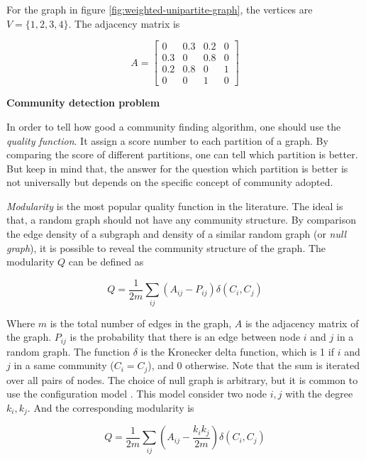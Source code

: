 For the graph in figure \ref{fig:weighted-unipartite-graph},
the vertices are $V = \{1, 2, 3, 4\}$.
The adjacency matrix is

\begin{equation*}
	A =
	\begin{bmatrix}
		0   & 0.3 & 0.2 & 0 \\
		0.3 & 0   & 0.8 & 0 \\
		0.2 & 0.8 & 0   & 1 \\
		0   & 0   & 1   & 0
	\end{bmatrix}
\end{equation*}

\textbf{Community detection problem}

In order to tell how good a community finding algorithm, one should use the \textit{quality function}.
It assign a score number to each partition of a graph.
By comparing the score of different partitions, one can tell which partition is better.
But keep in mind that, the answer for the question which partition is better is not universally
but depends on the specific concept of community adopted.

\textit{Modularity}\parencite{newman2004} is the most popular quality function in the literature.
The ideal is that, a random graph should not have any community structure.
By comparison the edge density of a subgraph and density of a similar random graph (or \textit{null graph}),
it is possible to reveal the community structure of the graph.
The modularity $Q$ can be defined as

\begin{equation}
	Q = \frac{1}{2m} \sum_{ij} \left(A_{ij} - P_{ij}\right) \delta(C_i, C_j)
\end{equation}

Where $m$ is the total number of edges in the graph,
$A$ is the adjacency matrix of the graph.
$P_{ij}$ is the probability that there is an edge between node $i$ and $j$ in a random graph.
The function $\delta$ is the Kronecker delta function,
which is 1 if $i$ and $j$ in a same community ($C_i = C_j$), and 0 otherwise.
Note that the sum is iterated over all pairs of nodes.
The choice of null graph is arbitrary, but it is common to use the configuration model \parencite{newman2004}.
This model consider two node $i, j$ with the degree $k_i, k_j$.
And the corresponding modularity is

\begin{equation}
	Q = \frac{1}{2m} \sum_{ij} \left(A_{ij} - \frac{k_i k_j}{2m}\right) \delta(C_i, C_j)
\end{equation}

